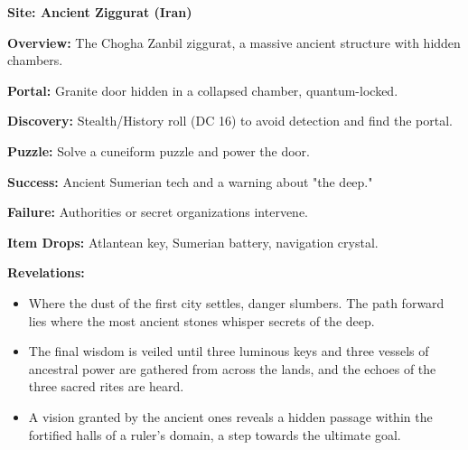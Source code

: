 \documentclass[12pt]{article}
\begin{document}
\textbf{Site: Ancient Ziggurat (Iran)}

\textbf{Overview:}  
The Chogha Zanbil ziggurat, a massive ancient structure with hidden chambers.

\textbf{Portal:}  
Granite door hidden in a collapsed chamber, quantum-locked.

\textbf{Discovery:}  
Stealth/History roll (DC 16) to avoid detection and find the portal.

\textbf{Puzzle:}  
Solve a cuneiform puzzle and power the door.

\textbf{Success:}  
Ancient Sumerian tech and a warning about "the deep."

\textbf{Failure:}  
Authorities or secret organizations intervene.

\textbf{Item Drops:}  
Atlantean key, Sumerian battery, navigation crystal.

\textbf{Revelations:}
\begin{itemize}
  \item Where the dust of the first city settles, danger slumbers. The path forward lies where the most ancient stones whisper secrets of the deep.
  \item The final wisdom is veiled until three luminous keys and three vessels of ancestral power are gathered from across the lands, and the echoes of the three sacred rites are heard.
  \item A vision granted by the ancient ones reveals a hidden passage within the fortified halls of a ruler's domain, a step towards the ultimate goal.
\end{itemize}
\end{document}
